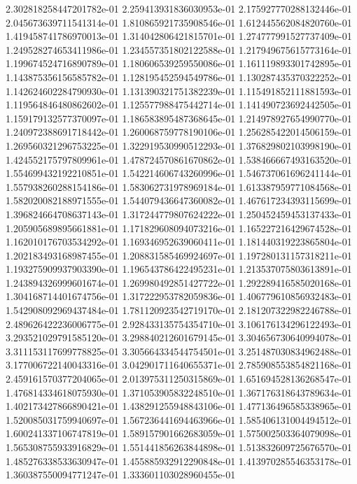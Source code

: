 2.302818258447201782e-01
2.259413931836030953e-01
2.175927770288132446e-01
2.045673639711541314e-01
1.810865921735908546e-01
1.612445562084820760e-01
1.419458741786970013e-01
1.314042806421815701e-01
1.274777991527737409e-01
1.249528274653411986e-01
1.234557351802122588e-01
1.217949675615773164e-01
1.199674524716890789e-01
1.180606539259550086e-01
1.161119893301742895e-01
1.143875356156585782e-01
1.128195452594549786e-01
1.130287435370322252e-01
1.142624602284790930e-01
1.131390321751382239e-01
1.115491852111881593e-01
1.119564846480862602e-01
1.125577988475442714e-01
1.141490723692442505e-01
1.159179132577370097e-01
1.186583895487368645e-01
1.214978927654990770e-01
1.240972388691718442e-01
1.260068759778190106e-01
1.256285422014506159e-01
1.269560321296753225e-01
1.322919530990512293e-01
1.376829802103998190e-01
1.424552175797809961e-01
1.478724570861670862e-01
1.538466667493163520e-01
1.554699432192210851e-01
1.542214606743260996e-01
1.546737061696241144e-01
1.557938260288154186e-01
1.583062731978969184e-01
1.613387959771084568e-01
1.582020082188971555e-01
1.544079436647360082e-01
1.467617234393115699e-01
1.396824664708637143e-01
1.317244779807624222e-01
1.250452459453137433e-01
1.205905689895661881e-01
1.171829608094073216e-01
1.165227216429674528e-01
1.162010176703534292e-01
1.169346952639060411e-01
1.181440319223865804e-01
1.202183493168987455e-01
1.208831585469924697e-01
1.197280131157318211e-01
1.193275909937903390e-01
1.196543786422495231e-01
1.213537075803613891e-01
1.243894326999601674e-01
1.269980492851427722e-01
1.292289416585020168e-01
1.304168714401674756e-01
1.317222953782059836e-01
1.406779610856932483e-01
1.542908092969437484e-01
1.781120923542719170e-01
2.181207322982246788e-01
2.489626422236006775e-01
2.928433135754354710e-01
3.106176134296122493e-01
3.293521029791585120e-01
3.298840212601679145e-01
3.304656730640994078e-01
3.311153117699778825e-01
3.305664334544754501e-01
3.251487030834962488e-01
3.177006722140043316e-01
3.042901711640655371e-01
2.785908553854821168e-01
2.459161570377204065e-01
2.013975311250315869e-01
1.651694528136268547e-01
1.476814334618075930e-01
1.371053905832248510e-01
1.367176318643789634e-01
1.402173427866890421e-01
1.438291255948843106e-01
1.477136496585338965e-01
1.520085031759940697e-01
1.567236441694463966e-01
1.585406131004494512e-01
1.600241337106747819e-01
1.589157901662683059e-01
1.575002503364079098e-01
1.565308755933916829e-01
1.551441856263844898e-01
1.513832609725676570e-01
1.485276338533630947e-01
1.455885932912290848e-01
1.413970285546353178e-01
1.360387550094771247e-01
1.333601103028960455e-01
